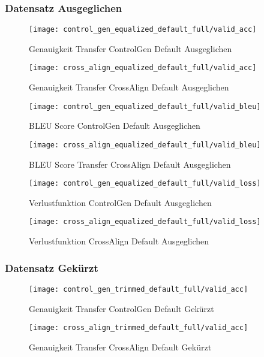 \subsubsection{Datensatz \flqq Ausgeglichen\frqq}

\begin{figure}[H]
    \texttt{[image: control\_gen\_equalized\_default\_full/valid\_acc]}
    \caption{Genauigkeit Transfer ControlGen Default \flqq Ausgeglichen\frqq}\label{fig:control_gen_equalized_default_full_valid_acc}
  \endminipage\hfill
    \texttt{[image: cross\_align\_equalized\_default\_full/valid\_acc]}
    \caption{Genauigkeit Transfer CrossAlign Default \flqq Ausgeglichen\frqq}\label{fig:cross_align_equalized_default_full_valid_acc}
  \endminipage\hfill   
\end{figure}

\begin{figure}[H]
    \texttt{[image: control\_gen\_equalized\_default\_full/valid\_bleu]}
    \caption{BLEU Score ControlGen Default \flqq Ausgeglichen\frqq}\label{fig:control_gen_equalized_default_full_valid_bleu}
  \endminipage\hfill
    \texttt{[image: cross\_align\_equalized\_default\_full/valid\_bleu]}
    \caption{BLEU Score Transfer CrossAlign Default \flqq Ausgeglichen\frqq}\label{fig:cross_align_equalized_default_full_valid_bleu}
  \endminipage\hfill   
\end{figure}

\begin{figure}[H]
    \texttt{[image: control\_gen\_equalized\_default\_full/valid\_loss]}
    \caption{Verlustfunktion ControlGen Default \flqq Ausgeglichen\frqq}\label{fig:control_gen_equalized_default_full_valid_loss}
  \endminipage\hfill
    \texttt{[image: cross\_align\_equalized\_default\_full/valid\_loss]}
    \caption{Verlustfunktion CrossAlign Default \flqq Ausgeglichen\frqq}\label{fig:cross_align_equalized_default_full_valid_loss}
  \endminipage\hfill   
\end{figure}
\noindent

\subsubsection{Datensatz \flqq Gekürzt\frqq}

\begin{figure}[H]
    \texttt{[image: control\_gen\_trimmed\_default\_full/valid\_acc]}
    \caption{Genauigkeit Transfer ControlGen Default \flqq Gekürzt\frqq}\label{fig:control_gen_trimmed_default_full_valid_acc}
  \endminipage\hfill
    \texttt{[image: cross\_align\_trimmed\_default\_full/valid\_acc]}
    \caption{Genauigkeit Transfer CrossAlign Default \flqq Gekürzt\frqq}\label{fig:cross_align_trimmed_default_full_valid_acc}
  \endminipage\hfill   
\end{figure}

